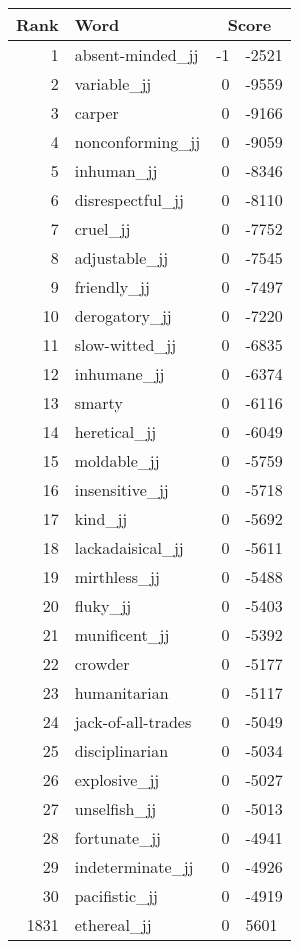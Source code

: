 \begin{longtable}[!htbp]{| rlr@{.}l |}
    \hline
    \textbf{Rank} & \textbf{Word} & \multicolumn{2}{c|}{\textbf{Score}} \\
    \hline
    \endhead
    1 & absent-minded\_jj & -1 & -2521 \\
    2 & variable\_jj & 0 & -9559 \\
    3 & carper & 0 & -9166 \\
    4 & nonconforming\_jj & 0 & -9059 \\
    5 & inhuman\_jj & 0 & -8346 \\
    6 & disrespectful\_jj & 0 & -8110 \\
    7 & cruel\_jj & 0 & -7752 \\
    8 & adjustable\_jj & 0 & -7545 \\
    9 & friendly\_jj & 0 & -7497 \\
    10 & derogatory\_jj & 0 & -7220 \\
    11 & slow-witted\_jj & 0 & -6835 \\
    12 & inhumane\_jj & 0 & -6374 \\
    13 & smarty & 0 & -6116 \\
    14 & heretical\_jj & 0 & -6049 \\
    15 & moldable\_jj & 0 & -5759 \\
    16 & insensitive\_jj & 0 & -5718 \\
    17 & kind\_jj & 0 & -5692 \\
    18 & lackadaisical\_jj & 0 & -5611 \\
    19 & mirthless\_jj & 0 & -5488 \\
    20 & fluky\_jj & 0 & -5403 \\
    21 & munificent\_jj & 0 & -5392 \\
    22 & crowder & 0 & -5177 \\
    23 & humanitarian & 0 & -5117 \\
    24 & jack-of-all-trades & 0 & -5049 \\
    25 & disciplinarian & 0 & -5034 \\
    26 & explosive\_jj & 0 & -5027 \\
    27 & unselfish\_jj & 0 & -5013 \\
    28 & fortunate\_jj & 0 & -4941 \\
    29 & indeterminate\_jj & 0 & -4926 \\
    30 & pacifistic\_jj & 0 & -4919 \\
    1831 & ethereal\_jj & 0 & 5601 \\

\end{longtable}
